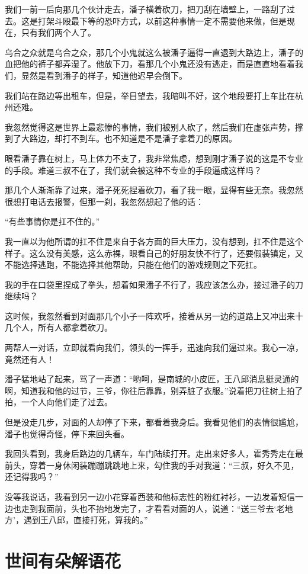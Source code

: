 我们一前一后向那几个伙计走去，潘子横着砍刀，把刀刮在墙壁上，一路刮了过去。这是打架斗殴最下等的恐吓方式，以前这种事情一定不需要他来做，但是现在，只有我们两个人了。

乌合之众就是乌合之众，那几个小鬼就这么被潘子逼得一直退到大路边上，潘子的血把他的裤子都弄湿了。他放下刀，看那几个小鬼还没有逃走，而是直直地看着我们，显然是看到潘子的样子，知道他迟早会倒下。

我们站在路边等出租车，但是，举目望去，我暗叫不好，这个地段要打上车比在杭州还难。

我忽然觉得这是世界上最悲惨的事情，我们被别人砍了，然后我们在虚张声势，撑到了大路边，却打不到车。也不知道是不是潘子拿着刀的原因。

眼看潘子靠在树上，马上体力不支了，我非常焦虑，想到刚才潘子说的这是不专业的手段。难道三叔不在了，我们就会被这种不专业的手段逼成这样吗？

那几个人渐渐靠了过来，潘子死死捏着砍刀，看了我一眼，显得有些无奈。我忽然很想打电话去报警，但那一刹，我忽然想起了他的话：

“有些事情你是扛不住的。”

我一直以为他所谓的扛不住是来自于各方面的巨大压力，没有想到，扛不住是这个样子。这么没有美感，这么赤裸，眼看自己的好朋友快不行了，还要假装镇定，又不能选择逃跑，不能选择其他帮助，只能在他们的游戏规则之下死扛。

我的手在口袋里捏成了拳头，想着如果潘子不行了，我应该怎么办，接过潘子的刀继续吗？

这时候，我忽然看到对面那几个小子一阵欢呼，接着从另一边的道路上又冲出来十几个人，所有人都拿着砍刀。

两帮人一对话，立即就看向我们，领头的一挥手，迅速向我们逼过来。我心一凉，竟然还有人！

潘子猛地站了起来，骂了一声道：“哟呵，是南城的小皮匠，王八邱消息挺灵通的啊，知道我和他的过节，三爷，你往后靠靠，别弄脏了衣服。”说着把刀往树上拍了拍，一个人向他们走了过去。

但是没走几步，对面的人却停了下来，都看着我身后。我看见他们的表情很尴尬，潘子也觉得奇怪，停下来回头看。

我回头看到，我身后路边的几辆车，车门陆续打开。走出来好多人，霍秀秀走在最前头，穿着一身休闲装蹦蹦跳跳地上来，勾住我的手对我道：“三叔，好久不见，还记得我吗？”

没等我说话，我看到另一边小花穿着西装和他标志性的粉红衬衫，一边发着短信一边也走到我面前，头也不抬地发完了，才看看对面的人，说道：“送三爷去‘老地方’，遇到王八邱，直接打死，算我的。”

\chapter{世间有朵解语花}

